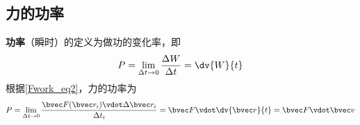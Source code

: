 \subsection{力的功率}
\textbf{功率}（瞬时）的定义为做功的变化率，即
\begin{equation}
P = \lim_{\Delta t\to 0} \frac{\Delta W}{\Delta t} = \dv{W}{t}
\end{equation}
根据\autoref{Fwork_eq2}，力的功率为
\begin{equation}
P = \lim_{\Delta t\to 0} \frac{\bvec F(\bvec r_i)\vdot\Delta\bvec r_i}{\Delta t_i} = \bvec F \vdot\dv{\bvec r}{t} = \bvec F\vdot\bvec v
\end{equation}






